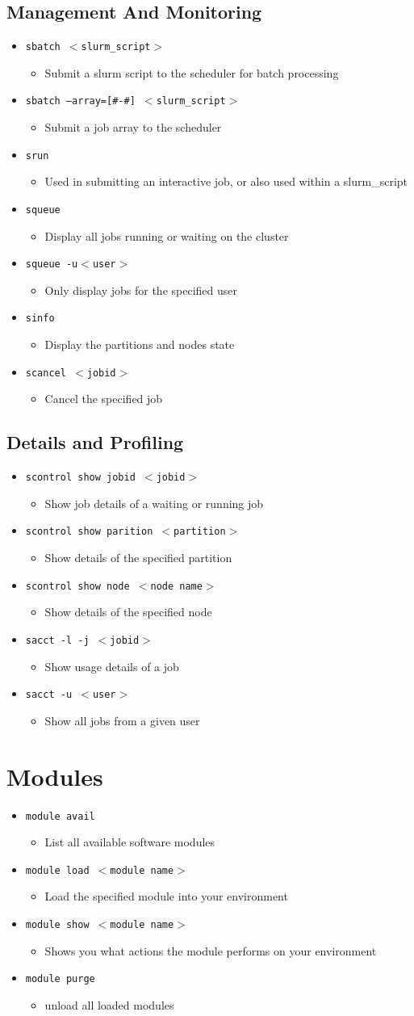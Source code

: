 \documentclass[11pt,twocolumn]{article}
\newcommand{\lft}{$<$}
\newcommand{\rht}{$>$}
\newcommand{\pth}[1]{{\lft}#1{\rht}}
\newcommand{\desc}[1]{\small \begin{itemize}\item[]#1\end{itemize}}
\begin{document}
\subsection{Management And Monitoring}
\begin{itemize}
\item[] \texttt{sbatch \pth{slurm\_script}}\desc{Submit a slurm script to the scheduler for batch processing}
\item[] \texttt{sbatch~--array=[\#-\#]~\pth{slurm\_script}}\desc{Submit a job array to the scheduler}
\item[] \texttt{srun} \desc{Used in submitting an interactive job, or also  used within a slurm\_script}
\item[] \texttt{squeue} \desc{Display all jobs running or waiting on the cluster}
\item[] \texttt{squeue -u{\lft}user{\rht}} \desc{Only display jobs for the specified user}
\item[]\texttt{sinfo} \desc{Display the partitions and nodes state}
\item[] \texttt{scancel {\lft}jobid{\rht}} \desc{Cancel the specified job}
\end{itemize}

\subsection{Details and Profiling}
\begin{itemize}
\item[] \texttt{scontrol show jobid {\lft}jobid{\rht}}\desc{Show job details of a waiting or running job}
\item[] \texttt{scontrol show parition {\lft}partition{\rht}}\desc{Show details of the specified partition}
\item[] \texttt{scontrol show node {\lft}node name{\rht}}\desc{Show details of the specified node}
\item[] \texttt{sacct -l -j {\lft}jobid{\rht}}\desc{Show usage details of a job}
\item[] \texttt{sacct -u {\lft}user{\rht}}\desc{Show all jobs from a given user}
\end{itemize}

\section{Modules}
\begin{itemize}
\item[] \texttt{module avail} \desc{List all available software modules}
\item[] \texttt{module load \pth{module name}} \desc{Load the specified module into your environment}
\item[] \texttt{module show \pth{module name}} \desc{Shows you what actions the module performs on your environment}
\item[] \texttt{module purge} \desc{unload all loaded modules}
\end{itemize}
\end{document}
